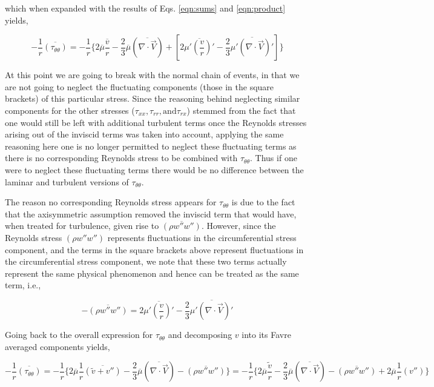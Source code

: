 	which when expanded with the results of Eqs. \ref{eqn:sums} and \ref{eqn:product} yields,

\begin{displaymath}
	-\frac{1}{r}\overline{(\tau_{\theta \theta})} = -\frac{1}{r}\Big\{2\overline{\mu}\frac{\overline{v}}{r} 
	 -\frac{2}{3}\overline{\mu}(\overline{\nabla \cdot \vec{V}}) + [2\overline{\mu'(\frac{v}{r})'} -
	\frac{2}{3}\overline{\mu'(\nabla \cdot \vec{V})'}]    \Big\} 
\end{displaymath}

	At this point we are going to break with the normal chain of events, in that we are not going to neglect
the fluctuating components (those in the square brackets) of this particular stress.  Since the reasoning behind 
neglecting similar components
for the other stresses ($\tau_{xx}, \tau_{rr}, \textrm{and} \tau_{rx}$) stemmed from the fact that one would still be left 
with additional turbulent terms once the Reynolds stresses arising out of the inviscid terms was taken into account, 
applying the same reasoning here one is no longer permitted to neglect these fluctuating terms as there is no 
corresponding Reynolds stress to be combined with $\tau_{\theta \theta}$.  Thus if one were to neglect these 
fluctuating terms there would be no difference between the laminar and turbulent versions of $\tau_{\theta \theta}$.

	The reason no corresponding Reynolds stress appears for $\tau_{\theta \theta}$ is due to the fact that
the axisymmetric assumption removed the inviscid term that would have, when treated for turbulence, given rise
to $\overline{(\rho w'' w'')}$.  However, since the Reynolds stress $(\rho w'' w'')$ represents fluctuations in the
circumferential stress component, and the terms in the square brackets above represent fluctuations in the circumferential
stress component, we note that these two terms actually represent the same physical phenomenon and hence can be treated
as the same term, i.e.,  

\begin{equation}
	-\overline{(\rho w'' w'')} = 2\overline{\mu'(\frac{v}{r})'} -
	\frac{2}{3}\overline{\mu'(\nabla \cdot \vec{V})'}
\label{eqn:rhoww}
\end{equation}


	Going back to the overall expression for $\tau_{\theta\theta}$ and decomposing $v$ into its Favre averaged 
components yields,

\begin{displaymath}
	-\frac{1}{r}\overline{(\tau_{\theta \theta})} = -\frac{1}{r}\Big\{2\overline{\mu}\frac{1}{r}\overline{(\tilde{v}+v'')} 
	 -\frac{2}{3}\overline{\mu}(\overline{\nabla \cdot \vec{V}}) -\overline{(\rho w'' w'')} \Big\} = -\frac{1}{r}\Big\{
	 2\overline{\mu}\frac{\tilde{v}}{r} -\frac{2}{3}\overline{\mu}(\overline{\nabla \cdot \vec{V}}) 
	-\overline{(\rho w'' w'')} +2\overline{\mu}\frac{1}{r}(v'')\Big\}
\end{displaymath}

